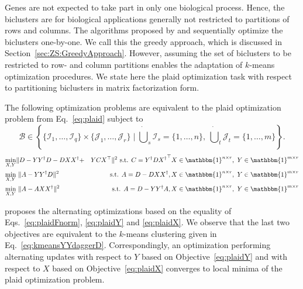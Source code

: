 Genes are not expected to take part in only one biological process. Hence, the biclusters are for biological applications generally not restricted to partitions of rows and columns. The algorithms proposed by \cite{cheng2000biclustering, lazzeroni2002plaid} and \cite{turner2005improved} sequentially optimize the biclusters one-by-one. We call this the greedy approach, which is discussed in Section~\ref{sec:ZS:GreedyApproach}. However, assuming the set of biclusters to be restricted to row- and column partitions enables the adaptation of $k$-means optimization procedures. We state here the plaid optimization task with respect to partitioning biclusters in matrix factorization form.
\begin{theorem}
The following optimization problems are equivalent to the plaid optimization problem from Eq.~\eqref{eq:plaid} subject to 
\[\mathcal{B}\in \left\{\{\mathcal{I}_1,\ldots,\mathcal{I}_q\}\times \{\mathcal{J}_1,\ldots,\mathcal{J}_r\}\mid \dot\bigcup_{s}\mathcal{I}_s=\{1,\ldots,n\},\  \dot\bigcup_{t}\mathcal{J}_t=\{1,\ldots,m\}\right\}.\]
\begin{align}
    \min_{X,Y}& \|D-YY^\dagger D - DXX^\dagger+&YCX^\top\|^2  \text{ s.t. } C=Y^\dagger D{X^\dagger}^\top X\in \mathbbm{1}^{n\times r},\ Y\in\mathbbm{1}^{m\times r}\label{eq:plaidFnorm}\\
    \min_{X,Y}&\ \|A-YY^\dagger D\|^2  &\text{s.t. } A=D-DXX^\dagger, X\in \mathbbm{1}^{n\times r},\ Y\in\mathbbm{1}^{m\times r}\label{eq:plaidY}\\
    \min_{X,Y}&\ \|A- AXX^\dagger\|^2  & \text{s.t. } A=D-YY^\dagger A, X\in \mathbbm{1}^{n\times r},\ Y\in\mathbbm{1}^{m\times r}\label{eq:plaidX}
\end{align}
\end{theorem}
\cite{cho2004minimum} proposes the alternating optimizations based on the equality of Eqs.~\eqref{eq:plaidFnorm}, \eqref{eq:plaidY} and \eqref{eq:plaidX}. We observe that the last two objectives are equivalent to the $k$-means clustering given in Eq.~\eqref{eq:kmeansYYdaggerD}. Correspondingly, an optimization performing alternating updates with respect to $Y$ based on Objective~\eqref{eq:plaidY} and with respect to $X$ based on Objective~\eqref{eq:plaidX} converges to local minima of the plaid optimization problem.
